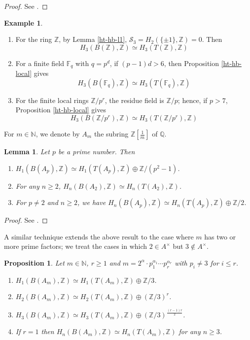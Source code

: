 \documentclass[11pt]{amsart}
\theoremstyle{definition}
\theoremstyle{plain}
\newtheorem{lem}[ntn]{Lemma}
\newtheorem{prp}[ntn]{Proposition}
\theoremstyle{definition}
\newtheorem{exm}[ntn]{Example}
\numberwithin{equation}{section}
\newcommand{\N}{\mathbb{N}}
\newcommand{\z}{\mathbb{Z}}
\newcommand{\q}{\mathbb{Q}}
\newcommand{\F}{\mathbb{F}}
\renewcommand{\SS}{\mathcal{S}}
\renewcommand{\aa}{{A^\times}}
\begin{document}
	\begin{proof}
		See \cite[Proposition 3.19 ]{hutchinson2017}.
	\end{proof}
	\begin{exm}\label{exa-hb-ht}
		\begin{enumerate}
			\item For the ring $\z$, by Lemma \ref{ht-hb-l1}, $\SS_3=H_2(\{\pm 1\},\z)=0$. Then
			\[
			H_3(B(\z),\z)\simeq H_3(T(\z),\z)
			\]
			\item For a finite field $\F_q$ with $q=p^d$, if $(p-1)d>6$, then Proposition \ref{ht-hb-local} gives
			\[
			H_3(B(\F_q),\z)\simeq H_3(T(\F_q),\z)
			\]
			\item For the finite local rings $\z/p^r$, the residue field is $\z/p$; hence, if $p>7$, Proposition \ref{ht-hb-local} gives
			\[
			H_3(B(\z/p^r),\z)\simeq H_3(T(\z/p^r),\z)
			\]
		\end{enumerate}
	\end{exm}
	For $m\in\N$, we denote by $A_m$ the subring $\z\left[\frac{1}{m}\right]$ of $\q$.
	\begin{lem}
		Let $p$ be a prime number. Then
		\begin{enumerate}
			\item $H_1(B(A_p),\z)\simeq H_1(T(A_p),\z)\oplus\z/(p^2-1)$.
			\item For any $n\geq 2$, $H_n(B(A_2),\z)\simeq H_n(T(A_2),\z)$.
			\item For $p\neq 2$ and $n\geq 2$, we have $H_n(B(A_p),\z)\simeq H_n(T(A_p),\z)\oplus\z/2$.
		\end{enumerate}
	\end{lem}
	\begin{proof}
		See \cite[Lemma 3.7]{B-E--2023}.
	\end{proof}
	A similar technique extends the above result to the case where $m$ has two or more prime factors; we treat the cases in which $2\in\aa$ but $3\notin\aa$.
	\begin{prp}\label{prp-hb-ht-am}
		Let $m\in\N$, $r\geq 1$ and $m=2^\alpha\cdot p_1^{\alpha_1}\cdots p_r^{\alpha_r}$ with $p_i\neq 3$ for $i\leq r$.
		\begin{enumerate}
			\item $H_1(B(A_m),\z)\simeq H_1(T(A_m),\z)\oplus \z/3$.
			\item $H_2(B(A_m),\z)\simeq H_2(T(A_m),\z)\oplus(\z/3)^r$.
			\item $H_3(B(A_m),\z)\simeq H_3(T(A_m),\z)\oplus(\z/3)^{\frac{(r-1)r}{2}}$.
			\item If $r=1$ then $H_n(B(A_m),\z)\simeq H_n(T(A_m),\z)$ for any $n\geq 3$.
		\end{enumerate}
	\end{prp}
\end{document}
